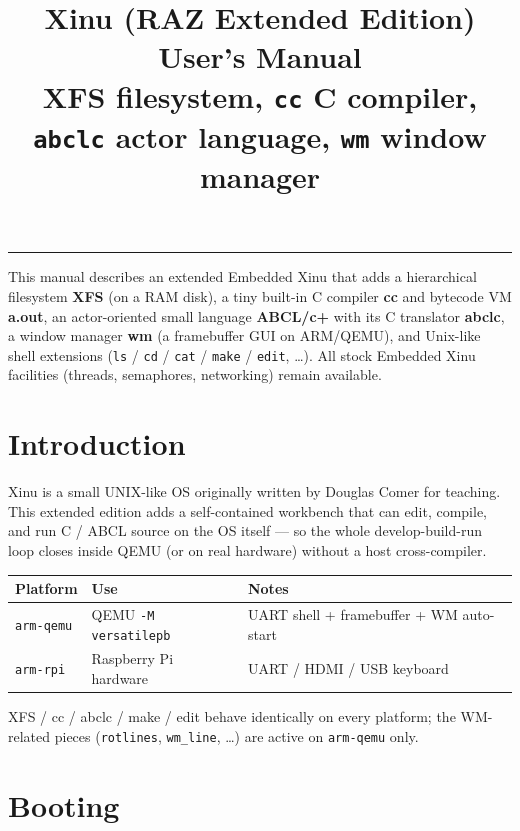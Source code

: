 \documentclass[a4paper,11pt]{article}
\title{\textbf{Xinu (RAZ Extended Edition)\\User's Manual}\\[3pt]
  \large XFS filesystem, \texttt{cc} C compiler, \texttt{abclc} actor language,
  \texttt{wm} window manager}
\author{}
\date{}
\begin{document}
\maketitle
\vspace{-2.0em}
\begin{center}\rule{0.9\textwidth}{0.4pt}\end{center}

This manual describes an extended Embedded Xinu that adds a hierarchical
filesystem \textbf{XFS} (on a RAM disk), a tiny built-in C compiler
\textbf{cc} and bytecode VM \textbf{a.out}, an actor-oriented small language
\textbf{ABCL/c+} with its C translator \textbf{abclc}, a window manager
\textbf{wm} (a framebuffer GUI on ARM/QEMU), and Unix-like shell extensions
(\texttt{ls} / \texttt{cd} / \texttt{cat} / \texttt{make} / \texttt{edit}, \dots).
All stock Embedded Xinu facilities (threads, semaphores, networking) remain
available.

{\small\tableofcontents}
\bigskip

\section{Introduction}
Xinu is a small UNIX-like OS originally written by Douglas Comer for teaching.
This extended edition adds a self-contained workbench that can edit, compile,
and run C / ABCL source on the OS itself --- so the whole develop-build-run
loop closes inside QEMU (or on real hardware) without a host cross-compiler.

\begin{center}\footnotesize
\begin{tabular}{@{}l l p{6.4cm}@{}}
\toprule
\textbf{Platform} & \textbf{Use} & \textbf{Notes}\\
\midrule
\verb|arm-qemu| & QEMU \verb|-M versatilepb| & UART shell + framebuffer + WM auto-start\\
\verb|arm-rpi|  & Raspberry Pi hardware     & UART / HDMI / USB keyboard\\
\bottomrule
\end{tabular}
\end{center}
XFS / cc / abclc / make / edit behave identically on every platform; the
WM-related pieces (\verb|rotlines|, \verb|wm_line|, \dots) are active on
\verb|arm-qemu| only.

\section{Booting}
\end{document}
